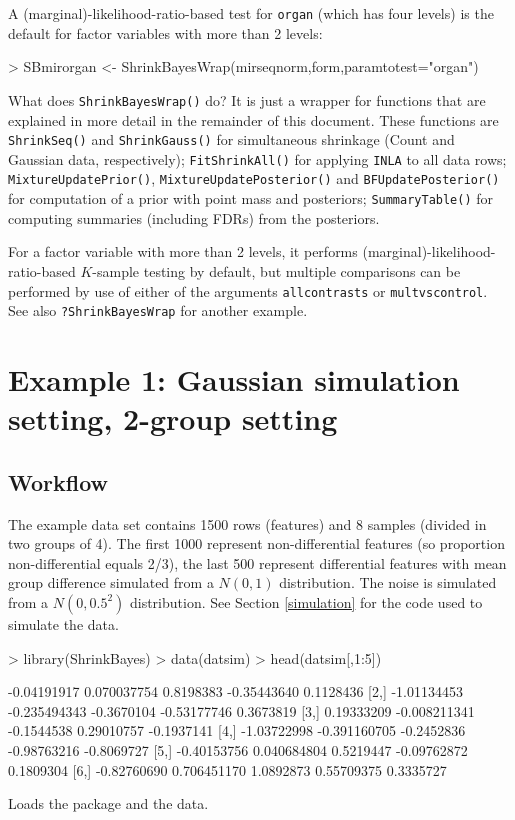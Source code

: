 \documentclass[11pt]{article}
\newcommand{\para}{\bigskip\noindent}
\begin{document}
\para
A (marginal)-likelihood-ratio-based test for \texttt{organ} (which has four levels) is the default for factor variables with more
than 2 levels:
\begin{Schunk}
\begin{Sinput}
> SBmirorgan <- ShrinkBayesWrap(mirseqnorm,form,paramtotest="organ")
\end{Sinput}
\end{Schunk}


\para
What does \texttt{ShrinkBayesWrap()} do? It is just a wrapper for functions that are explained in more detail in the remainder of this document.
These functions are \texttt{ShrinkSeq()} and \texttt{ShrinkGauss()} for simultaneous shrinkage (Count and Gaussian data, respectively); \texttt{FitShrinkAll()} for applying \texttt{INLA}
to all data rows;  \texttt{MixtureUpdatePrior()}, \texttt{MixtureUpdatePosterior()}  and \texttt{BFUpdatePosterior()} for computation
of a prior with point mass and posteriors; \texttt{SummaryTable()} for computing summaries (including FDRs) from the posteriors.

\para
For a factor variable with more than 2 levels, it performs (marginal)-likelihood-ratio-based $K$-sample testing by default, but multiple comparisons
can be performed by use of either of the arguments \texttt{allcontrasts} or \texttt{multvscontrol}. See also \texttt{?ShrinkBayesWrap} for another example.


\section{Example 1: Gaussian simulation setting, 2-group setting}\label{simul}
\subsection{Workflow}
The example data set contains 1500 rows (features) and 8 samples (divided in two groups of 4).
The first 1000 represent non-differential features (so proportion non-differential equals 2/3), the
last 500 represent differential features with mean group difference simulated from a $N(0,1)$ distribution.
The noise is simulated from a $N(0,0.5^2)$ distribution.
See Section \ref{simulation} for the code used to simulate the data.

\para
\begin{Schunk}
\begin{Sinput}
> library(ShrinkBayes)
> data(datsim)
> head(datsim[,1:5])
\end{Sinput}
\begin{Soutput}
            [,1]         [,2]       [,3]        [,4]       [,5]
[1,] -0.04191917  0.070037754  0.8198383 -0.35443640  0.1128436
[2,] -1.01134453 -0.235494343 -0.3670104 -0.53177746  0.3673819
[3,]  0.19333209 -0.008211341 -0.1544538  0.29010757 -0.1937141
[4,] -1.03722998 -0.391160705 -0.2452836 -0.98763216 -0.8069727
[5,] -0.40153756  0.040684804  0.5219447 -0.09762872  0.1809304
[6,] -0.82760690  0.706451170  1.0892873  0.55709375  0.3335727
\end{Soutput}
\end{Schunk}
Loads the package and the data.
\end{document}
